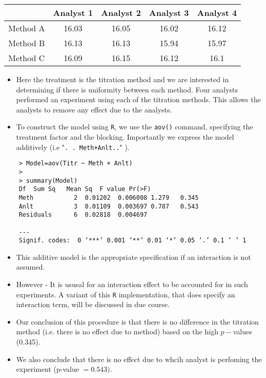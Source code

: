 \documentclass[12pt]{article}
\begin{document}
\begin{center}
	\begin{tabular}{|c|c|c|c|c|}
		\hline 	& Analyst 1	&Analyst 2	&Analyst 3	&Analyst 4	\\ \hline
		Method A	&	16.03	&	16.05	&	16.02	&	16.12	\\ \hline
		Method B	&	16.13	&	16.13	&	15.94	&	15.97	\\ \hline
		Method C	&	16.09	&	16.15	&	16.12	&	16.1	\\ \hline
	\end{tabular}
\end{center}
\begin{itemize}
	\item Here the treatment is the titration method and we are interested in determining if there is uniformity between each method. Four analysts performed an experiment using each of the titration methods. This allows the analysts to remove any effect due to the analysts.
	
	\item To construct the model using \texttt{R}, we use the \texttt{aov()} command, specifying the treatment factor and the blocking. Importantly we express the model additively (i.e "\texttt{. . Meth+Anlt..}" ).
\end{itemize}


\begin{framed}
	\begin{verbatim}
	> Model=aov(Titr ~ Meth + Anlt) 
	> 
	> summary(Model) 
	Df  Sum Sq   Mean Sq  F value Pr(>F)    
	Meth           2  0.01202  0.006008 1.279   0.345  
	Anlt           3  0.01109  0.003697 0.787   0.543  
	Residuals      6  0.02818  0.004697   
	
	---
	Signif. codes:  0 ‘***’ 0.001 ‘**’ 0.01 ‘*’ 0.05 ‘.’ 0.1 ‘ ’ 1
	\end{verbatim}
\end{framed}
\begin{itemize}
	\item This additive model is the appropriate specification if an interaction is not assumed. 
	\item However - It is ususal for an interaction effect to be accounted for in such experiments.
	A variant of this \texttt{R} implementation, that does specify an interaction term, will be discussed in due course.
	\item 
	Our conclusion of this procedure is that there is no difference in the titration method (i.e. there is no effect due to method) based on the high $p-$values  (0.345).
	\item We also conclude that there is no effect due to whcih analyst is perfoming the experiment (p-value $=0.543)$.
\end{itemize}
\end{document}
